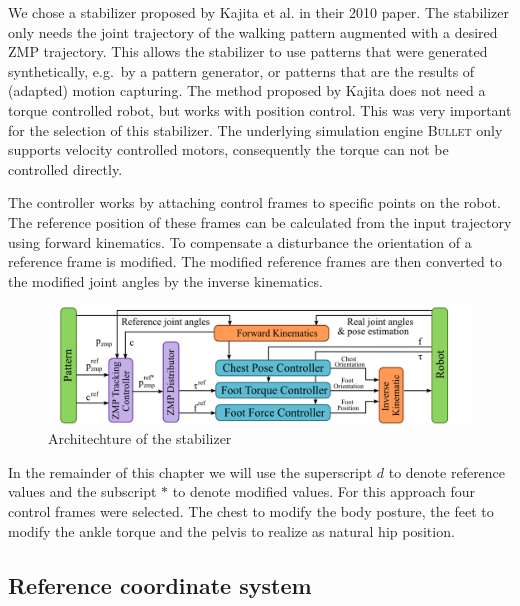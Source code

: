 \documentclass[english,ngerman]{KITreprt}
\newcommand{\name}[1]{\textsc{#1}}
\begin{document}
We chose a stabilizer proposed by Kajita et al. in their 2010 paper.
\cite{kajita2010biped} The stabilizer only needs the joint trajectory of
the walking pattern augmented with a desired ZMP trajectory. This allows
the stabilizer to use patterns that were generated synthetically,
e.g.~by a pattern generator, or patterns that are the results of
(adapted) motion capturing. The method proposed by Kajita does not need
a torque controlled robot, but works with position control. This was
very important for the selection of this stabilizer. The underlying
simulation engine \name{Bullet} only supports velocity controlled
motors, consequently the torque can not be controlled directly.

The controller works by attaching control frames to specific points on
the robot. The reference position of these frames can be calculated from
the input trajectory using forward kinematics. To compensate a
disturbance the orientation of a reference frame is modified. The
modified reference frames are then converted to the modified joint
angles by the inverse kinematics.

\begin{figure}[tb]
\vspace*{-1em}
\includegraphics[width=\textwidth]{images/stabilizer_architechture.png}
\caption{Architechture of the stabilizer}
\label{img:archtitechture-stabiluzer}
\end{figure}

In the remainder of this chapter we will use the superscript $d$ to
denote reference values and the subscript $*$ to denote modified values.
For this approach four control frames were selected. The chest to modify
the body posture, the feet to modify the ankle torque and the pelvis to
realize as natural hip position.

\subsection{Reference coordinate
system}\label{reference-coordinate-system}
\end{document}
